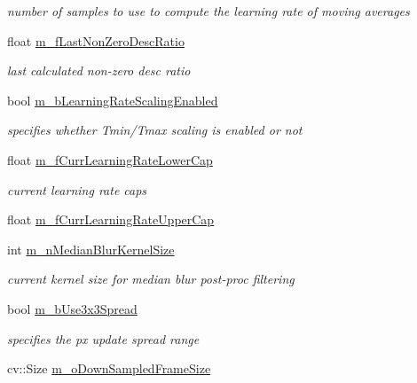 \begin{DoxyCompactItemize}
\begin{DoxyCompactList}\small\item\em number of samples to use to compute the learning rate of moving averages \end{DoxyCompactList}\item 
float \mbox{\hyperlink{class_background_subtractor_su_b_s_e_n_s_e_a4231d025a90be64a703f3f0aff1345c8}{m\+\_\+f\+Last\+Non\+Zero\+Desc\+Ratio}}
\begin{DoxyCompactList}\small\item\em last calculated non-\/zero desc ratio \end{DoxyCompactList}\item 
bool \mbox{\hyperlink{class_background_subtractor_su_b_s_e_n_s_e_afca07a4c7edca7761e55dfbdf6da4263}{m\+\_\+b\+Learning\+Rate\+Scaling\+Enabled}}
\begin{DoxyCompactList}\small\item\em specifies whether Tmin/\+Tmax scaling is enabled or not \end{DoxyCompactList}\item 
float \mbox{\hyperlink{class_background_subtractor_su_b_s_e_n_s_e_a57fdd29e43afc163233e55f9a7cd9f37}{m\+\_\+f\+Curr\+Learning\+Rate\+Lower\+Cap}}
\begin{DoxyCompactList}\small\item\em current learning rate caps \end{DoxyCompactList}\item 
float \mbox{\hyperlink{class_background_subtractor_su_b_s_e_n_s_e_a44ba1a1ed365c5829baa517ce9f27508}{m\+\_\+f\+Curr\+Learning\+Rate\+Upper\+Cap}}
\item 
int \mbox{\hyperlink{class_background_subtractor_su_b_s_e_n_s_e_a796120fecb11f00914925e14065ee5ab}{m\+\_\+n\+Median\+Blur\+Kernel\+Size}}
\begin{DoxyCompactList}\small\item\em current kernel size for median blur post-\/proc filtering \end{DoxyCompactList}\item 
bool \mbox{\hyperlink{class_background_subtractor_su_b_s_e_n_s_e_a1e2e28840e7ca373282607db81b49e12}{m\+\_\+b\+Use3x3\+Spread}}
\begin{DoxyCompactList}\small\item\em specifies the px update spread range \end{DoxyCompactList}\item 
cv\+::\+Size \mbox{\hyperlink{class_background_subtractor_su_b_s_e_n_s_e_af3e1eb902a5b6b46a1c229864423bd20}{m\+\_\+o\+Down\+Sampled\+Frame\+Size}}

\end{DoxyCompactItemize}
